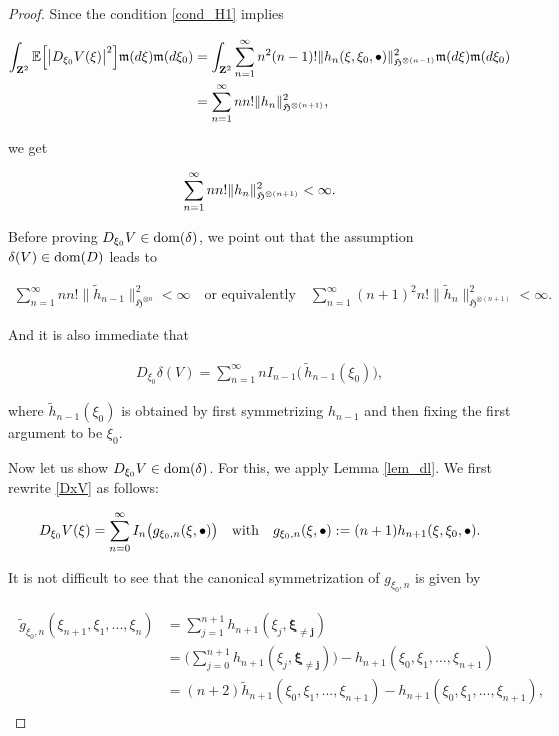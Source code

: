 \documentclass[letterpaper, 11pt,  reqno]{amsart}
\newcommand{\noi}{\noindent}
\newcommand{\bul}{\bullet}
\newcommand{\E}{\mathbb{E}}
\newcommand{\dl}{\delta}
\newcommand{\wt}{\widetilde}
\newcommand{\fm}{\mathfrak{m}}
\newcommand{\fH}{\mathfrak{H}}
\newcommand{\dom}{\textup{dom}}
\numberwithin{equation}{section}
\numberwithin{theorem}{section}
\begin{document}
\begin{proof}
\noi
Since 
the condition \eqref{cond_H1}    implies

\noi
\begin{align}
\int_{\mathbf{Z}^2} \E \Big[ \big| D_{\xi_0} V(\xi) \big|^2 \Big]  \fm(d\xi) \fm(d\xi_0) 
&=  \int_{\mathbf{Z}^2}  \sum_{n=1}^\infty n^2 (n-1)! \| h_n(\xi, \xi_0, \bul) \|^2_{\fH^{\otimes (n-1)}}  
\fm(d\xi) \fm(d\xi_0) \notag   \\
&= \sum_{n=1}^\infty n  n! \| h_n \|^2_{\fH^{\otimes (n+1)}},
\label{cond_H2}
\end{align}  

\noi
we get 

\noi
\begin{align}
\sum_{n=1}^\infty n  n! \| h_n \|^2_{\fH^{\otimes (n+1)}} < \infty.
 \notag%
\end{align}  

Before proving  $D_{\xi_0} V\in\dom(\dl)$,
we point out that the assumption $\dl(V)\in\dom(D)$ leads to 

\noi
\begin{align}
\sum_{n=1}^\infty n n! \| \wt{h}_{n-1}\|^2_{\fH^{\otimes n}} <\infty
\quad\text{or equivalently}
\quad
\sum_{n=1}^\infty (n+1)^2 n! \| \wt{h}_{n}\|^2_{\fH^{\otimes (n+1)}} <\infty.
\label{cond_H3}
\end{align}

\noi
And it is also immediate that 

\noi
\begin{align}
D_{\xi_0} \dl(V) = \sum_{n=1}^\infty n I_{n-1}\big(  \, \wt{h}_{n-1}(\xi_0) \big), 
\label{Dxdl}
\end{align}

\noi
where $ \wt{h}_{n-1}(\xi_0) $ is obtained by first symmetrizing $h_{n-1}$
and then fixing the first argument to be $\xi_0$.

Now let us show $D_{\xi_0} V\in\dom(\dl)$.
For this, we apply Lemma \ref{lem_dl}.
We first rewrite \eqref{DxV} as follows:


\noi
\begin{align*}
 D_{\xi_0} V(\xi)  =  \sum_{n=0}^\infty I_n\big( g_{\xi_0, n}(\xi, \bul) \big)
 \quad
 {\rm with}
 \quad
 g_{\xi_0, n}(\xi, \bul) := (n+1) h_{n+1}(\xi, \xi_0, \bul).
\end{align*}
 
\noi
It is not difficult to see that the canonical symmetrization of $ g_{\xi_0, n}$ is given by 

\noi
\begin{align}\label{syms}
\begin{aligned}
\wt  g_{\xi_0, n}(\xi_{n+1},  \xi_1, ... , \xi_n) 
&= \sum_{j=1}^{n+1} h_{n+1}(\xi_j,  \pmb{\xi_{\neq j}}) \\
&= \bigg(  \sum_{j=0}^{n+1} h_{n+1}(\xi_j,  \pmb{\xi_{\neq j}})  \bigg) - h_{n+1}(\xi_0, \xi_1, ... , \xi_{n+1}) \\
&= (n+2) \wt{h}_{n+1}(\xi_0, \xi_1, ... , \xi_{n+1}) - h_{n+1}(\xi_0, \xi_1, ... , \xi_{n+1}),
\end{aligned} 
\end{align} 
 

\end{proof}
\end{document}
